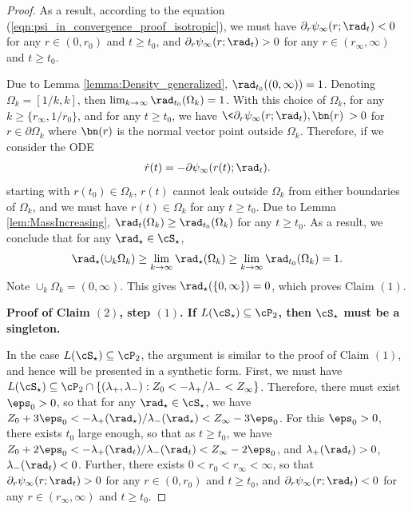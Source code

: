 \documentclass[11pt]{article}
\begin{document}
\begin{proof}
As a result, according to the equation (\ref{eqn:psi_in_convergence_proof_isotropic}), we must have $\partial_r \psi_\infty(r; \rad_t) < 0$ for any $r \in (0, r_0)$ and $t \ge t_0$, and $\partial_r \psi_\infty(r; \rad_t) > 0$ for any $r \in (r_\infty, \infty)$ and $t \ge t_0$. 

Due to Lemma \ref{lemma:Density_generalized}, $\rad_{t_0}((0, \infty)) = 1$. Denoting $\Omega_k = [1/k, k]$, then $\lim_{k \to \infty} \rad_{t_0}(\Omega_k) = 1$. With this choice of $\Omega_k$, for any $k \ge \{ r_\infty, 1/r_0 \}$, and for any $t \ge t_0$, we have $ \< \partial_r \psi_\infty( r ; \rad_t), \bn(r)\> > 0$ for $r \in \partial \Omega_k$ where $\bn(r)$ is the normal vector point outside $\Omega_k$. Therefore, if we consider the ODE 
\begin{align}\label{eqn:ODE_in_isotropic_proof}
\dot r(t) = - \partial \psi_\infty(r(t); \rad_t). 
\end{align}
starting with $r(t_0) \in \Omega_k$, $r(t)$ cannot leak outside $\Omega_k$ from either boundaries of $\Omega_k$, and we must have $r(t) \in \Omega_k$ for any $t \ge t_0$. Due to Lemma \ref{lem:MassIncreasing}, $\rad_{t}(\Omega_k) \ge \rad_{t_0}(\Omega_k)$ for any $t \ge t_0$. As a result, we conclude that for any $\rad_\star \in \cS_\star$, 
\begin{equation}
\rad_\star(\cup_k  \Omega_k) \ge \lim_{k\to \infty} \rad_\star( \Omega_k) \ge \lim_{k\to \infty} \rad_{t_0}(\Omega_k) = 1.
\end{equation}
Note $\cup_k \Omega_k = (0, \infty)$. This gives $\rad_\star(\{0, \infty \}) = 0$, which proves Claim $(1)$.


\vskip 0.2cm
\noindent
{\bf Proof of Claim $(2)$, step $(1)$. If $L(\cS_\star) \subseteq \cP_2$, then $\cS_\star$ must be a singleton. } 

In the case $L(\cS_\star) \subseteq \cP_2$, the argument is similar to the proof of Claim $(1)$, and hence will be presented in a synthetic form. First, we must have $L(\cS_\star) \subseteq \cP_2 \cap \{(\lambda_+, \lambda_-) : Z_0 < - \lambda_+ / \lambda_- < Z_\infty \}$. Therefore, there must exist $\eps_0 > 0$, so that for any $\rad_\star \in \cS_\star$, we have $Z_0 + 3\eps_0 < -\lambda_+(\rad_\star) / \lambda_-(\rad_\star) < Z_\infty - 3\eps_0$. For this $\eps_0 > 0$, there exists $t_0$ large enough, so that as $t \ge t_0$, we have $Z_0 + 2\eps_0 < - \lambda_+(\rad_t) / \lambda_-(\rad_t) < Z_\infty - 2\eps_0$, and $\lambda_+(\rad_t) > 0$, $\lambda_-(\rad_t) < 0$. Further, there exists $0 < r_0 < r_\infty < \infty$, so that $\partial_r \psi_\infty(r; \rad_t) > 0$ for any $r \in (0, r_0)$ and $t \ge t_0$, and $\partial_r \psi_\infty(r; \rad_t) < 0$ for any $r \in (r_\infty, \infty)$ and $t \ge t_0$. 


\end{proof}
\end{document}
